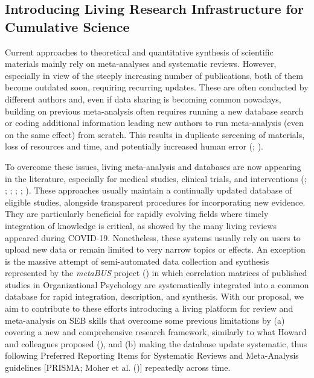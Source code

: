 \documentclass[
  man,
  longtable,
  nolmodern,
  notxfonts,
  notimes,
  colorlinks=true,linkcolor=blue,citecolor=blue,urlcolor=blue]{apa7}
\begin{document}
\subsection{Introducing Living Research Infrastructure for Cumulative
Science}\label{introducing-living-research-infrastructure-for-cumulative-science}

Current approaches to theoretical and quantitative synthesis of
scientific materials mainly rely on meta-analyses and systematic
reviews. However, especially in view of the steeply increasing number of
publications, both of them become outdated soon, requiring recurring
updates. These are often conducted by different authors and, even if
data sharing is becoming common nowadays, building on previous
meta-analysis often requires running a new database search or coding
additional information leading new authors to run meta-analysis (even on
the same effect) from scratch. This results in duplicate screening of
materials, loss of resources and time, and potentially increased human
error (; ).

To overcome these issues, living meta-analysis and databases are now
appearing in the literature, especially for medical studies, clinical
trials, and interventions
(; ; ; ;
;
). These approaches usually maintain a continually updated
database of eligible studies, alongside transparent procedures for
incorporating new evidence. They are particularly beneficial for rapidly
evolving fields where timely integration of knowledge is critical, as
showed by the many living reviews appeared during COVID-19. Nonetheless,
these systems usually rely on users to upload new data or remain limited
to very narrow topics or effects. An exception is the massive attempt of
semi-automated data collection and synthesis represented by the
\emph{metaBUS} project
() in which correlation matrices of published studies
in Organizational Psychology are systematically integrated into a common
database for rapid integration, description, and synthesis. With our
proposal, we aim to contribute to these efforts introducing a living
platform for review and meta-analysis on SEB skills that overcome some
previous limitations by (a) covering a new and comprehensive research
framework, similarly to what Howard and colleagues proposed
(), and (b) making the database
update systematic, thus following Preferred Reporting Items for
Systematic Reviews and Meta-Analysis guidelines {[}PRISMA; Moher et al.
(){]} repeatedly
across time.
\end{document}
